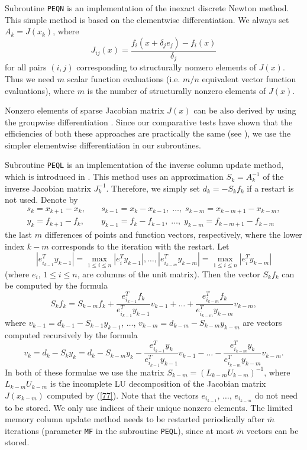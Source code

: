 \documentclass{esub2acm}
\newcommand{\be}{\begin{equation}}
\newcommand{\ee}{\end{equation}}
\newcommand{\beq}{\begin{eqnarray*}}
\newcommand{\eeq}{\end{eqnarray*}}
\begin{document}
\vspace{3mm}

\noindent Subroutine {\tt PEQN} is an implementation of the inexact
discrete Newton method. This sim\-ple method is based on the elementwise
differentiation. We always set $A_k = J(x_k)$, where
%
\be
J_{ij}(x) = \frac{f_i(x + \delta_j e_j) - f_i(x)}{\delta_j}
\label{77}
\ee
%
for all pairs $(i,j)$ corresponding to structurally nonzero elements
of $J(x)$. Thus we need $m$ scalar function evaluations (i.e. $m/n$
equivalent vector function evaluations), where $m$ is the number of
structurally nonzero elements of $J(x)$.

Nonzero elements of sparse Jacobian matrix $J(x)$ can be also derived
by using the groupwise differentiation \cite{com2}. Since our comparative
tests have shown that the efficiencies of both these approaches are
practically the same (see \cite{luv2}), we use the simpler
elementwise differentiation in our subroutines. %

\vspace{5mm}


\vspace{3mm}

\noindent Subroutine {\tt PEQL} is an implementation of the inverse
column update method, which is introduced in \cite{maz1}. This
method uses an approximation $S_k = A_k^{-1}$ of the inverse
Jacobian matrix $J_k^{-1}$. Therefore, we simply set
$d_k = -S_k f_k$ if a restart is not used. Denote by
%
\beq
s_k = x_{k+1} - x_k, & \; & s_{k-1} = x_k - x_{k-1},
\; \dots, \; s_{k-m} = x_{k-m+1} - x_{k-m}, \\
y_k = f_{k+1} - f_k, & \; & y_{k-1} = f_k - f_{k-1},
\; \dots, \; y_{k-m} = f_{k-m+1} - f_{k-m}
\eeq
%
the last $m$ differences of points and function vectors, respectively, where the
lower index $k-m$ corresponds to the iteration with the restart. Let
%
$$|e_{i_{k-1}}^T y_{k-1}| = \max_{1 \leq i \leq n} |e_i^T y_{k-1}|, \dots,
|e_{i_{k-m}}^T y_{k-m}| = \max_{1 \leq i \leq n} | e_i^T y_{k-m} |$$
%
(where $e_i$, $1 \leq i \leq n$, are columns of the unit matrix). Then the
vector $S_k f_k$ can be computed by the formula
%
$$S_k f_k = S_{k-m} f_k +
\frac{e_{i_{k-1}}^T f_k}{e_{i_{k-1}}^T y_{k-1}} v_{k-1} + \dots +
\frac{e_{i_{k-m}}^T f_k}{e_{i_{k-m}}^T y_{k-m}} v_{k-m},$$
%
where $v_{k-1} = d_{k-1} - S_{k-1} y_{k-1}$, $\dots$,
$v_{k-m} = d_{k-m} - S_{k-m} y_{k-m}$ are vectors computed recursively
by the formula
%
$$v_k = d_k - S_k y_k = d_k - S_{k-m} y_k -
\frac{e_{i_{k-1}}^T y_k}{e_{i_{k-1}}^T y_{k-1}} v_{k-1} - \dots -
\frac{e_{i_{k-m}}^T y_k}{e_{i_{k-m}}^T y_{k-m}} v_{k-m}.$$
%
In both of these formulae we use the matrix $S_{k-m} = (L_{k-m} U_{k-m})^{-1}$,
where $L_{k-m} U_{k-m}$ is the incomplete LU decomposition of the Jacobian
matrix $J(x_{k-m})$ computed by (\ref{77}).
Note that the vectors $e_{i_{k-1}}$, $\dots$, $e_{i_{k-m}}$ do not need
to be stored. We only use indices of their unique nonzero elements.
The limited memory column update method needs to be restarted periodically
after $\overline{m}$ iterations (parameter {\tt MF} in the subroutine {\tt PEQL}),
since at most $\overline{m}$ vectors can be stored.
\end{document}
